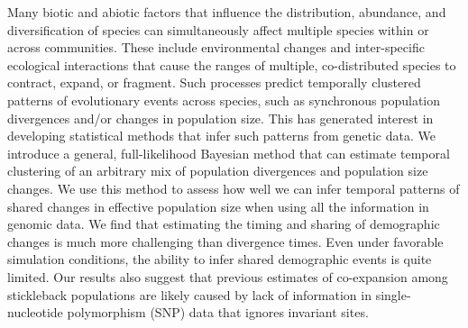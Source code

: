 Many biotic and abiotic factors that influence the distribution, abundance, and
diversification of species can simultaneously affect multiple species within or
across communities.
These include environmental changes and inter-specific ecological interactions
that cause the ranges of multiple, co-distributed species to contract, expand,
or fragment.
Such processes predict temporally clustered patterns of evolutionary events
across species, such as synchronous population divergences and/or changes in
population size.
This has generated interest in developing statistical methods that infer such
patterns from genetic data.
We introduce a general, full-likelihood Bayesian method that can estimate
temporal clustering of an arbitrary mix of population divergences and
population size changes.
We use this method to assess how well we can infer temporal patterns of shared
changes in effective population size when using all the information in genomic
data.
We find that estimating the timing and sharing of demographic changes is much
more challenging than divergence times.
Even under favorable simulation conditions, the ability to infer shared
demographic events is quite limited.
Our results also suggest that previous estimates of co-expansion among
stickleback populations are likely caused by lack of information in
single-nucleotide polymorphism (SNP) data that ignores invariant sites.
